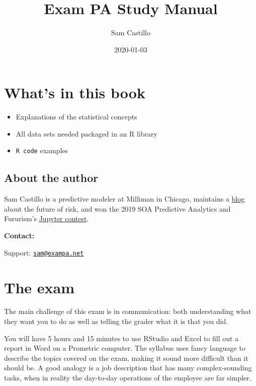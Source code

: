 \documentclass[openany]{book}
\title{Exam PA Study Manual}
\author{Sam Castillo}
\date{2020-01-03}
\providecommand{\tightlist}{%
  \setlength{\itemsep}{0pt}\setlength{\parskip}{0pt}}
\begin{document}
\maketitle

{
\setcounter{tocdepth}{1}
\tableofcontents
}
\hypertarget{whats-in-this-book}{%
\chapter{What's in this book}\label{whats-in-this-book}}

\begin{itemize}
\tightlist
\item
  Explanations of the statistical concepts
\item
  All data sets needed packaged in an R library
\item
  \texttt{R\ code} examples
\end{itemize}

\hypertarget{about-the-author}{%
\section{About the author}\label{about-the-author}}

Sam Castillo is a predictive modeler at Milliman in Chicago, maintains a \href{http://artificialactuary.com/}{blog} about the future of risk, and won the 2019 SOA Predictive Analytics and Fururism's \href{https://nbviewer.jupyter.org/github/SOASections/SOA-Predictive-Modeling-Innovation-and-Industry-Contest-2019-First-Place/blob/master/Predicting\%20Uncertainty\%20Prediction\%20Intervals\%20from\%20Gradient\%20Boosted\%20Quantile\%20Regression.ipynb}{Jupyter contest}.

\textbf{Contact:}

Support: \href{mailto:sam@exampa.net}{\nolinkurl{sam@exampa.net}}

\hypertarget{the-exam}{%
\chapter{The exam}\label{the-exam}}

The main challenge of this exam is in communication: both understanding what they want you to do as well as telling the grader what it is that you did.

You will have 5 hours and 15 minutes to use RStudio and Excel to fill out a report in Word on a Prometric computer. The syllabus uses fancy language to describe the topics covered on the exam, making it sound more difficult than it should be. A good analogy is a job description that has many complex-sounding tasks, when in reality the day-to-day operations of the employee are far simpler.
\end{document}
